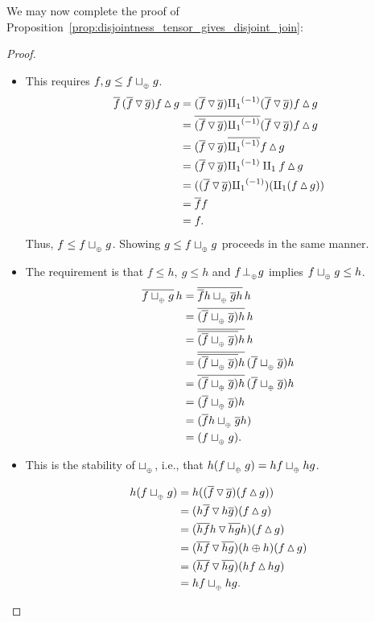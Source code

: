 We may now complete the proof of Proposition~\ref{prop:disjointness_tensor_gives_disjoint_join}:
\begin{proof}
  \begin{itemize}
    \item [\axiom{DJ}{1}] This requires $f, g \le f \tjoin g$.
      \begin{align*}
        \rst{f}\,(\rst{f}\tjdown\rst{g})  f\tjup g
          &= (\rst{f}\tjdown\rst{g}) \icpa (\rst{f}\tjdown\rst{g} ) f\tjup g \\
        &=\rst{(\rst{f}\tjdown\rst{g}) \icpa} (\rst{f}\tjdown\rst{g}) f\tjup g  \\
        &=(\rst{f}\tjdown\rst{g}) \rst{\icpa} f\tjup g  \\
        &=(\rst{f}\tjdown\rst{g}) \icpa \cpa f\tjup g \\
        &=((\rst{f}\tjdown\rst{g}) \icpa) (\cpa (f \tjup g)) \\
        &= \rst{f} f \\
        &=f.
      \end{align*}
      Thus, $f \le f \tjoin g$. Showing $g \le f \tjoin g$ proceeds in the same manner.
    \item [\axiom{DJ}{2}] The requirement is that $f \le h,\ g\le h$ and $f\tperp g$ implies
      $f \tjoin g \le h$.
      \begin{align*}
        \rst{f \tjoin g} \,h & = \rst{\rst{f} h \tjoin \rst{g} h} \,h\\
        & = \rst{(\rst{f} \tjoin \rst{g})h} \,h\\
        & = \rst{\rst{(\rst{f} \tjoin \rst{g})}h} \,h\\
        & = \rst{\rst{(\rst{f} \tjoin \rst{g})}h}\,(\rst{f} \tjoin \rst{g})h\\
        & = \rst{(\rst{f} \tjoin \rst{g})h}\,(\rst{f} \tjoin \rst{g})h\\
        & = (\rst{f}\tjoin \rst{g})h\\
        & = (\rst{f}h\tjoin \rst{g}h)\\
        & = (f\tjoin g).
      \end{align*}
    \item [\axiom{DJ}{3}] This is the stability of $\tjoin$, i.e., that
      $h(f\tjoin g) = h f \tjoin h g$.

      \begin{align*}
        h (f\tjoin g) &= h ((\rst{f}\tjdown\rst{g})  (f \tjup g))\\
        &= (h\rst{f}\tjdown h\rst{g}) (f \tjup g)\\
        &= (\rst{h f}h\tjdown \rst{h g}h)  (f \tjup g)\\
        &= (\rst{h f}\tjdown \rst{h g})(h\+h)  (f \tjup g)\\
        &= (\rst{h f}\tjdown \rst{h g}) (h f \tjup h g)\\
        &= h f \tjoin h g.
      \end{align*}



\end{itemize}
\end{proof}
